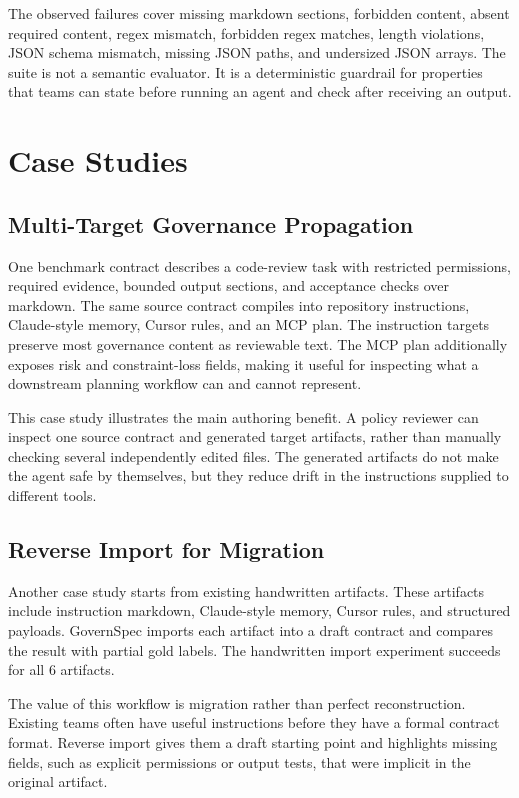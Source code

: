 \documentclass[11pt]{article}
\begin{document}
The observed failures cover missing markdown sections, forbidden content, absent
required content, regex mismatch, forbidden regex matches, length violations, JSON
schema mismatch, missing JSON paths, and undersized JSON arrays. The suite is not a
semantic evaluator. It is a deterministic guardrail for properties that teams can
state before running an agent and check after receiving an output.

\section{Case Studies}

\subsection{Multi-Target Governance Propagation}

One benchmark contract describes a code-review task with restricted permissions,
required evidence, bounded output sections, and acceptance checks over markdown. The
same source contract compiles into repository instructions, Claude-style memory,
Cursor rules, and an MCP plan. The instruction targets preserve most governance
content as reviewable text. The MCP plan additionally exposes risk and
constraint-loss fields, making it useful for inspecting what a downstream planning
workflow can and cannot represent.

This case study illustrates the main authoring benefit. A policy reviewer can
inspect one source contract and generated target artifacts, rather than manually
checking several independently edited files. The generated artifacts do not make the
agent safe by themselves, but they reduce drift in the instructions supplied to
different tools.

\subsection{Reverse Import for Migration}

Another case study starts from existing handwritten artifacts. These artifacts
include instruction markdown, Claude-style memory, Cursor rules, and structured
payloads. GovernSpec imports each artifact into a draft contract and compares the
result with partial gold labels. The handwritten import experiment succeeds for all
6 artifacts.

The value of this workflow is migration rather than perfect reconstruction.
Existing teams often have useful instructions before they have a formal contract
format. Reverse import gives them a draft starting point and highlights missing
fields, such as explicit permissions or output tests, that were implicit in the
original artifact.
\end{document}
